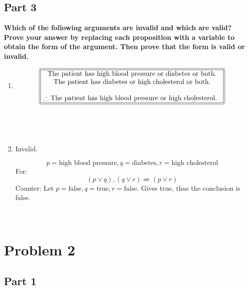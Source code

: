 \documentclass{amsart}
\theoremstyle{definition}
\theoremstyle{Exercise}
\theoremstyle{remark}
\theoremstyle{rule}
\numberwithin{equation}{section}
\begin{document}
\subsection*{Part 3}
{\bf Which of the following arguments are invalid and which are valid? Prove your answer by replacing each proposition with a variable to obtain the form of the argument. Then prove that the form is valid or invalid.}\\
 \begin{enumerate}[label=(\alph*)]
  \item \[
\begin{array}{||c||}
\hline \hline
\text{The patient has high blood pressure or diabetes or both.}\\
\text {The patient has diabetes or high cholesterol or both.}\\
\\
\therefore \text {The patient has high blood pressure or high cholesterol.
}\\
\hline \hline
\end{array}
\]\\\\\
\item Invalid.

\[
p = \text{high blood pressure}, q = \text{diabetes}, r = \text{high cholesterol}
\]
For:
\[
(p \lor q), (q \lor r) \not\Rightarrow (p \lor r)
\]
Counter:
Let \( p = \text{false}, q = \text{true}, r = \text{false} \). Gives true, thus the conclusion is false.
\\\\\

 
    \end{enumerate}
 \newpage

\section*{Problem 2}
\subsection*{Part 1}
\end{document}
